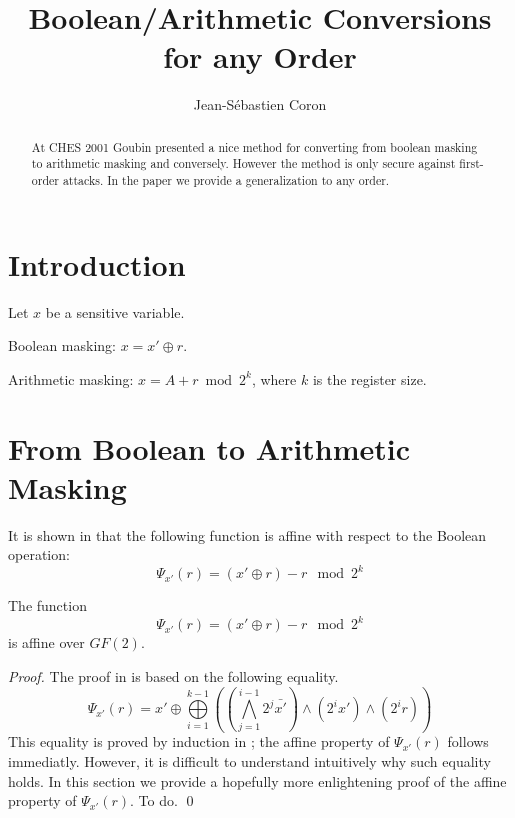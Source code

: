 \documentclass[11pt]{llncs}
\begin{document}
\title{Boolean/Arithmetic Conversions  for any Order}

\author{
Jean-S\'ebastien Coron}

\maketitle

\begin{abstract}
At CHES 2001 Goubin presented a nice method for converting from boolean
masking to arithmetic masking and conversely. However the method is
only secure against first-order attacks. In the paper we provide a
generalization to any order.
\end{abstract}

\section{Introduction}

Let $x$ be a sensitive variable. 

Boolean masking: $x=x' \oplus r$.

Arithmetic masking: $x=A+ r \bmod 2^k$, where $k$ is the register
size.


\section{From Boolean to Arithmetic Masking}

It is shown in \cite{goubin} that the following function is affine
with respect to the Boolean operation:
$$ \Psi_{x'}(r) = (x' \oplus r) -r \mod 2^k$$

\begin{theorem}
The function $$ \Psi_{x'}(r) = (x' \oplus r) -r \mod 2^k$$ is affine
over $GF(2)$.
\end{theorem}

\begin{proof}
The proof in \cite{goubin} is based on the following equality.
$$ \Psi_{x'}(r)=x' \oplus \bigoplus\limits_{i=1}^{k-1} \left( \left(
\bigwedge\limits_{j=1}^{i-1} 2^j \bar{x'} \right) \wedge (2^i x') \wedge
(2^i r) \right)$$
This equality is proved by induction in \cite{goubin}; the affine
property of $\Psi_{x'}(r)$ follows immediatly.  However, it is
difficult to understand intuitively why such equality holds. In this
section we provide a hopefully more enlightening  proof of the affine
property of $\Psi_{x'}(r)$. To do.
\qed
 \end{proof}
\end{document}
